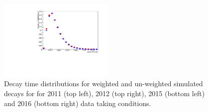 \begin{figure}[htbp]
    \includegraphics[width=0.49\textwidth]{./Figs/LifetimeMeasurement/2016_B_TAU_Bd2KPi_MC_weighted_and_unweighted.pdf}
  \caption{Decay time distributions for weighted and un-weighted \bdkpi simulated decays for for 2011 (top left), 2012 (top right), 2015 (bottom left) and 2016 (bottom right) data taking conditions.}
  \label{fig:BdToKpi_weightDecayTime}
\end{figure}


